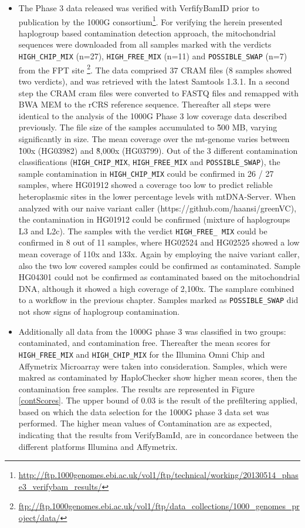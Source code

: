 \begin{itemize}
\item The Phase 3 data released was verified with VerfifyBamID prior to publication by the 1000G consortium\footnote{\url{http://ftp.1000genomes.ebi.ac.uk/vol1/ftp/technical/working/20130514_phase3_verifybam_results/}}. For verifying the herein presented haplogroup based contamination detection approach, the mitochondrial sequences were downloaded from all samples marked with the verdicts \verb|HIGH_CHIP_MIX| (n=27), \verb|HIGH_FREE_MIX| (n=11) and \verb|POSSIBLE_SWAP| (n=7) from the FPT site \footnote{\url{ftp://ftp.1000genomes.ebi.ac.uk/vol1/ftp/data_collections/1000_genomes_project/data/}}. The data comprised 37 CRAM files (8 samples showed two verdicts), and was retrieved with the latest Samtools 1.3.1. In a second step the CRAM cram files were converted to FASTQ files and remapped with BWA MEM to the rCRS reference sequence. Thereafter all steps were identical to the analysis of the 1000G Phase 3 low coverage data described previously.
The file size of the samples accumulated to \~ 500 MB, varying significantly in size. The mean coverage over the mt-genome varies between \~100x (HG03982) and \~8,000x (HG03799). Out of the 3 different contamination classifications (\verb|HIGH_CHIP_MIX|, \verb|HIGH_FREE_MIX| and \verb|POSSIBLE_SWAP|), the sample contamination in \verb|HIGH_CHIP_MIX| could be confirmed in 26 / 27 samples, where HG01912 showed a coverage too low to predict reliable heteroplasmic sites in the lower percentage levels with mtDNA-Server. When analyzed with our naive variant caller (https://github.com/haansi/greenVC), the contamination in HG01912 could be confirmed (mixture of haplogroups L3 and L2c). The samples with the verdict \verb|HIGH_FREE_ MIX| could be confirmed in 8  out of 11 samples, where HG02524 and HG02525 showed a low mean coverage of 110x and 133x. Again by employing the naive variant caller, also the two low covered samples could be confirmed as contaminated. Sample HG04301 could not be confirmed as contaminated based on the mitochondrial DNA, although it showed a high coverage of 2,100x. The samplare combined to a workflow in the previous chapter. Samples marked as \verb|POSSIBLE_SWAP| did not show signs of haplogroup contamination.
\item Additionally all data from the 1000G phase 3 was classified in two groups: contaminated, and contamination free. Thereafter the mean scores for  \verb|HIGH_FREE_MIX| and \verb|HIGH_CHIP_MIX| for the Illumina Omni Chip and Affymetrix Microarray were taken into consideration. Samples, which were makred as contaminated by HaploChecker show higher mean scores, then the contamination free samples. The results are represented in Figure \ref{contScores}. The upper bound of 0.03 is the result of the prefiltering applied, based on which the data selection for the 1000G phase 3 data set was performed. The higher mean values of Contamination are as expected, indicating that the results from VerifyBamId, are in concordance between the different platforms Illumina and Affymetrix.

\end{itemize}

